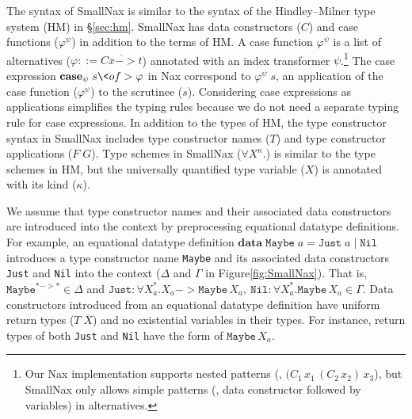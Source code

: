The syntax of SmallNax is similar to the syntax of 
the Hindley--Milner type system (HM) in \S\ref{sec:hm}.
SmallNax has data constructors ($C$) and case functions ($\varphi^\psi$)
in addition to the terms of HM. A case function $\varphi^\psi$ is
a list of alternatives ($\varphi ::= \overline{C \overline{x} -> t}$)
annotated with an index transformer $\psi$.\footnote{Our Nax implementation
	supports nested patterns (\eg, $(C_1\,x_1\,(C_2\,x_2)\,x_3$), but
	SmallNax only allows simple patterns (\ie, data constructor
	followed by variables) in alternatives.}
The case expression $\textbf{case}_\psi\;s\<of> \varphi$ in Nax
correspond to $\varphi^\psi\;s$, an application of the case function
($\varphi^\psi$) to the scrutinee ($s$). Considering case expressions as
applications simplifies the typing rules because we do not need
a separate typing rule for case expressions. In addition to the types of HM,
the type constructor syntax in SmallNax includes type constructor names ($T$)
and type constructor applications ($F\;G$). Type schemes in SmallNax 
($\forall X^\kappa.$) is similar to the type schemes in HM, but
the universally quantified type variable ($X$) is annotated with
its kind ($\kappa$).

We assume that type constructor names and their associated data constructors are
introduced into the context by preprocessing equational datatype definitions.
For example, an equational datatype definition
$\textbf{data}\;\texttt{Maybe}\;a = \texttt{Just}\;a \mid \texttt{Nil}$
introduces a type constructor name \texttt{Maybe} and its associated
data constructors \texttt{Just} and \texttt{Nil} into the context
($\Delta$ and $\Gamma$ in Figure\;\ref{fig:SmallNax}). That is,
$\texttt{Maybe}^{* -> *} \in \Delta$ and
$\texttt{Just}: \forall X_a^{*}.X_a -> \texttt{Maybe}\,X_a,~
 \texttt{Nil} : \forall X_a^{*}.\texttt{Maybe}\,X_a \in \Gamma$.
Data constructors introduced from an equational datatype definition have
uniform return types ($T\;\overline{X}$) and no existential variables
in their types. For instance, return types of both \texttt{Just} and
\texttt{Nil} have the form of $\texttt{Maybe}\,X_a$.

